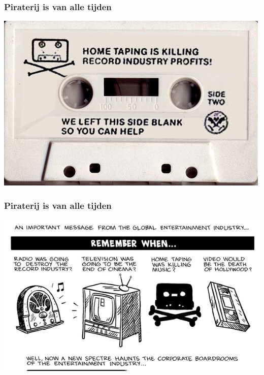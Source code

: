 \documentclass{beamer}
\begin{document}
\begin{frame}
	\frametitle{Piraterij is van alle tijden}

	\begin{center}
	\includegraphics[width=\textwidth]{tape.jpg}
	\end{center}
\end{frame}

\begin{frame}
	\frametitle{Piraterij is van alle tijden}

	\begin{center}
	\includegraphics[width=\textwidth]{industry.jpg}
	\end{center}
\end{frame}
\end{document}
